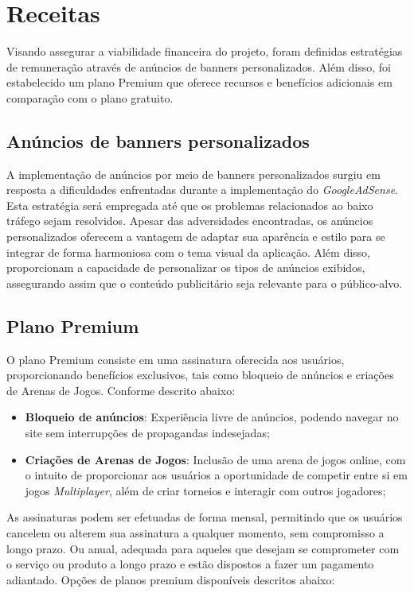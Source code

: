 \section{Receitas}

Visando assegurar a viabilidade financeira do projeto, foram definidas estratégias de remuneração através de anúncios de banners personalizados. Além disso, foi estabelecido um plano Premium que oferece recursos e benefícios adicionais em comparação com o plano gratuito.

\subsection{Anúncios de banners personalizados}

A implementação de anúncios por meio de banners personalizados surgiu em resposta a dificuldades enfrentadas durante a implementação do \textit{\gls{GoogleAdSense}}. Esta estratégia será empregada até que os problemas relacionados ao baixo tráfego sejam resolvidos. Apesar das adversidades encontradas, os anúncios personalizados oferecem a vantagem de adaptar sua aparência e estilo para se integrar de forma harmoniosa com o tema visual da aplicação. Além disso, proporcionam a capacidade de personalizar os tipos de anúncios exibidos, assegurando assim que o conteúdo publicitário seja relevante para o público-alvo.

\subsection{Plano Premium}

O plano Premium consiste em uma assinatura oferecida aos usuários, proporcionando benefícios exclusivos, tais como bloqueio de anúncios e criações de Arenas de Jogos. Conforme descrito abaixo:

\begin{itemize}
    \item \textbf{Bloqueio de anúncios}: Experiência livre de anúncios, podendo navegar no site sem interrupções de propagandas indesejadas;
     \item \textbf{Criações de Arenas de Jogos}: Inclusão de uma arena de jogos online, com o intuito de proporcionar aos usuários a oportunidade de competir entre si em jogos \textit{\gls{Multiplayer}}, além de criar torneios e interagir com outros jogadores;
\end{itemize}

As assinaturas podem ser efetuadas de forma mensal, permitindo que os usuários cancelem ou alterem sua assinatura a qualquer momento, sem compromisso a longo prazo. Ou anual, adequada para aqueles que desejam se comprometer com o serviço ou produto a longo prazo e estão dispostos a fazer um pagamento adiantado. Opções de planos premium disponíveis descritos abaixo:

